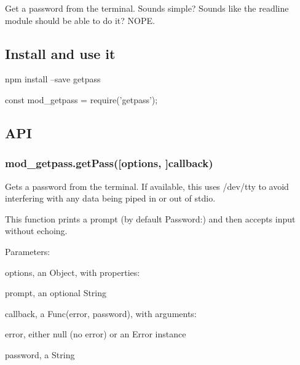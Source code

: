 Get a password from the terminal. Sounds simple? Sounds like the {\ttfamily readline} module should be able to do it? N\+O\+PE.

\subsection*{Install and use it}


\begin{DoxyCode}
npm install --save getpass
\end{DoxyCode}



\begin{DoxyCode}
const mod\_getpass = require('getpass');
\end{DoxyCode}


\subsection*{A\+PI}

\subsubsection*{{\ttfamily mod\+\_\+getpass.\+get\+Pass(\mbox{[}options, \mbox{]}callback)}}

Gets a password from the terminal. If available, this uses {\ttfamily /dev/tty} to avoid interfering with any data being piped in or out of stdio.

This function prints a prompt (by default {\ttfamily Password\+:}) and then accepts input without echoing.

Parameters\+:


\begin{DoxyItemize}
\item {\ttfamily options}, an Object, with properties\+:
\begin{DoxyItemize}
\item {\ttfamily prompt}, an optional String
\end{DoxyItemize}
\item {\ttfamily callback}, a {\ttfamily Func(error, password)}, with arguments\+:
\begin{DoxyItemize}
\item {\ttfamily error}, either {\ttfamily null} (no error) or an {\ttfamily Error} instance
\item {\ttfamily password}, a String 
\end{DoxyItemize}
\end{DoxyItemize}